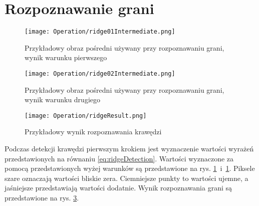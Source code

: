 \section{Rozpoznawanie grani}
\label{sec:dzialanieRidge}

\begin{figure}[h]
\begin{center}
\texttt{[image: Operation/ridge01Intermediate.png]}
\end{center}
\caption{Przykładowy obraz pośredni używany przy rozpoznawaniu grani, wynik warunku pierwszego}
\label{fig:ridgeIntermediate1}
\end{figure}

\begin{figure}[h]
\begin{center}
\texttt{[image: Operation/ridge02Intermediate.png]}
\end{center}
\caption{Przykładowy obraz pośredni używany przy rozpoznawaniu grani, wynik warunku drugiego}
\label{fig:ridgeIntermediate2}
\end{figure}

\begin{figure}[h]
\begin{center}
\texttt{[image: Operation/ridgeResult.png]}
\end{center}
\caption{Przykładowy wynik rozpoznawania krawędzi}
\label{fig:ridgeResult}
\end{figure}

Podczas detekcji krawędzi pierwszym krokiem jest wyznaczenie wartości wyrażeń przedstawionych na równaniu \ref{eq:ridgeDetection}. Wartości wyznaczone za pomocą przedstawionych wyżej warunków są przedstawione na rys. \ref{fig:ridgeIntermediate1}~i~\ref{fig:ridgeIntermediate1}. Piksele szare oznaczają wartości bliskie zera. Ciemniejsze punkty to wartości ujemne, a jaśniejsze przedstawiają wartości dodatnie. Wynik rozpoznawania grani są przedstawione na rys. \ref{fig:ridgeResult}.
